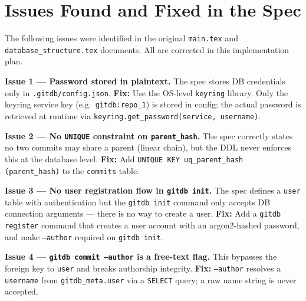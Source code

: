 \documentclass[12pt, a4paper]{article}
\begin{document}
\tableofcontents
\newpage

\section{Issues Found and Fixed in the Spec}

The following issues were identified in the original \texttt{main.tex} and
\texttt{database\_structure.tex} documents. All are corrected in this
implementation plan.

\begin{tcolorbox}[warningbox]
\textbf{Issue 1 --- Password stored in plaintext.}
The spec stores DB credentials only in \texttt{.gitdb/config.json}.
\textbf{Fix:} Use the OS-level \texttt{keyring} library. Only the keyring
service key (e.g.\ \texttt{gitdb:repo\_1}) is stored in config; the actual
password is retrieved at runtime via
\texttt{keyring.get\_password(service, username)}.
\end{tcolorbox}

\begin{tcolorbox}[warningbox]
\textbf{Issue 2 --- No \texttt{UNIQUE} constraint on \texttt{parent\_hash}.}
The spec correctly states no two commits may share a parent (linear chain), but
the DDL never enforces this at the database level.
\textbf{Fix:} Add \texttt{UNIQUE KEY uq\_parent\_hash (parent\_hash)} to the
\texttt{commits} table.
\end{tcolorbox}

\begin{tcolorbox}[warningbox]
\textbf{Issue 3 --- No user registration flow in \texttt{gitdb init}.}
The spec defines a \texttt{user} table with authentication but the \texttt{gitdb
init} command only accepts DB connection arguments --- there is no way to create
a user.
\textbf{Fix:} Add a \texttt{gitdb register} command that creates a user account
with an argon2-hashed password, and make \texttt{--author} required on
\texttt{gitdb init}.
\end{tcolorbox}

\begin{tcolorbox}[warningbox]
\textbf{Issue 4 --- \texttt{gitdb commit --author} is a free-text flag.}
This bypasses the foreign key to \texttt{user} and breaks authorship integrity.
\textbf{Fix:} \texttt{--author} resolves a \texttt{username} from
\texttt{gitdb\_meta.user} via a \texttt{SELECT} query; a raw name string is
never accepted.
\end{tcolorbox}
\end{document}
